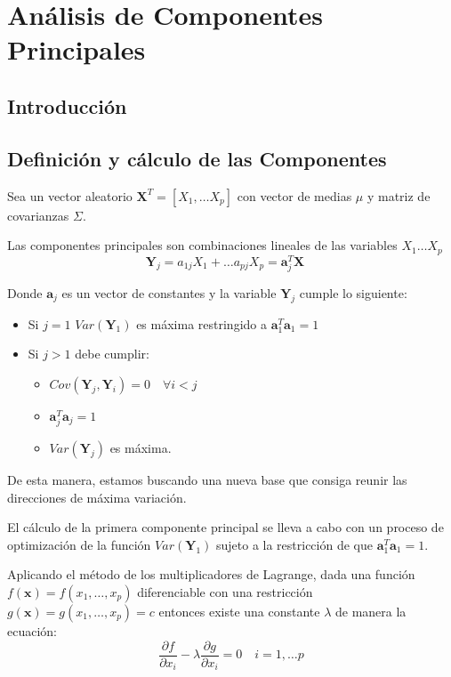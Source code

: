 \newpage
\section{Análisis de Componentes Principales}
\subsection{Introducción}

%

\subsection{Definición y cálculo de las Componentes}

\noindent Sea un vector aleatorio $\textbf{X}^T=[X_1,\ldots X_p]$ con vector de medias $\mu$ y matriz de covarianzas $\Sigma$.
\begin{defi}
Las componentes principales son combinaciones lineales de las variables $X_1 \ldots X_p$
\begin{equation}
\textbf{Y}_j=a_{1j}X_1+\ldots a_{pj}X_p=\textbf{a}_j^T\textbf{X}\quad 
\end{equation}

\noindent Donde $\textbf{a}_j$ es un vector de constantes y la variable $\textbf{Y}_j$ cumple lo siguiente:
\begin{itemize}
\item Si $j=1$ $Var(\textbf{Y}_1)$ es máxima restringido a $\textbf{a}_1^T \textbf{a}_1=1$
\item Si $j>1$ debe cumplir:
\begin{itemize}
\item $Cov(\textbf{Y}_j,\textbf{Y}_i)=0\quad \forall i<j $
\item $\textbf{a}_j^T \textbf{a}_j=1$
\item $Var(\textbf{Y}_j)$ es máxima. 
\end{itemize}

\end{itemize}

\noindent De esta manera, estamos buscando una nueva base que consiga reunir las direcciones de máxima variación. 
\end{defi}

\noindent El cálculo de la primera componente principal se lleva a cabo con un proceso de optimización de la función $Var(\textbf{Y}_1)$ sujeto a la restricción de que $\textbf{a}_1^T\textbf{a}_1=1$. 

\noindent Aplicando el método de los multiplicadores de Lagrange,  dada una función $f(\textbf{x})=f(x_1,\ldots, x_p)$ diferenciable con una restricción $g(\textbf{x})=g(x_1, \ldots, x_p)=c$ entonces existe una constante $\lambda$ de manera la ecuación:
\begin{equation}
\dfrac{\partial f}{\partial x_i}-\lambda\dfrac{\partial g}{\partial x_i}=0 \quad i=1,\ldots p 
\end{equation}

